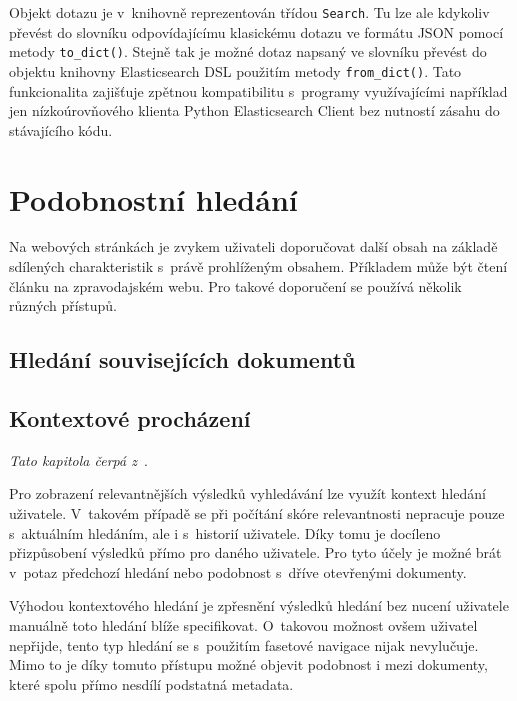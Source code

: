 Objekt dotazu je v~knihovně reprezentován třídou \texttt{Search}. Tu lze ale kdykoliv převést do slovníku odpovídajícímu klasickému dotazu ve formátu JSON pomocí metody \texttt{to\_dict()}. Stejně tak je možné dotaz napsaný ve slovníku převést do objektu knihovny Elasticsearch DSL použitím metody \texttt{from\_dict()}. Tato funkcionalita zajišťuje zpětnou kompatibilitu s~programy využívajícími například jen nízkoúrovňového klienta Python Elasticsearch Client bez nutností zásahu do stávajícího kódu.



\section{Podobnostní hledání}
Na webových stránkách je zvykem uživateli doporučovat další obsah na základě sdílených charakteristik s~právě prohlíženým obsahem. Příkladem může být čtení článku na zpravodajském webu. Pro takové doporučení se používá několik různých přístupů.

\subsection{Hledání souvisejících dokumentů}
\blindtext[2]

\subsection{Kontextové procházení}
\emph{Tato kapitola čerpá z~\cite{bib:similarity-context}}.

Pro zobrazení relevantnějších výsledků vyhledávání lze využít kontext hledání uživatele. V~takovém případě se při počítání skóre relevantnosti nepracuje pouze s~aktuálním hledáním, ale i s~historií uživatele. Díky tomu je docíleno přizpůsobení výsledků přímo pro daného uživatele.
Pro tyto účely je možné brát v~potaz předchozí hledání nebo podobnost s~dříve otevřenými dokumenty.

Výhodou kontextového hledání je zpřesnění výsledků hledání bez nucení uživatele manuálně toto hledání blíže specifikovat. O~takovou možnost ovšem uživatel nepřijde, tento typ hledání se s~použitím fasetové navigace nijak nevylučuje. 
Mimo to je díky tomuto přístupu možné objevit podobnost i mezi dokumenty, které spolu přímo nesdílí podstatná metadata. 


